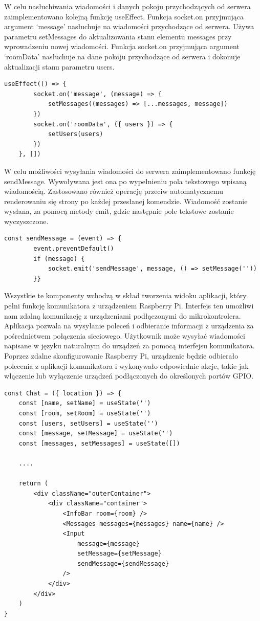 W celu nasłuchiwania wiadomości i danych pokoju przychodzących od serwera zaimplementowano kolejną funkcję useEffect. Funkcja socket.on przyjmująca argument ‘message’ nasłuchuje na wiadomości przychodzące od serwera. Używa parametru setMessages do aktualizowania stanu elementu messages przy wprowadzeniu nowej wiadomości. Funkcja socket.on przyjmująca argument ‘roomData’ nasłuchuje na dane pokoju przychodzące od serwera i dokonuje aktualizacji stanu parametru users. 
\begin{lstlisting}[caption=Implementacja funkcji nasłuchiwania wiadomości i danych przychodzących od serwera]
useEffect(() => {
        socket.on('message', (message) => {
            setMessages((messages) => [...messages, message])
        })
        socket.on('roomData', ({ users }) => {
            setUsers(users)
        })
    }, [])
\end{lstlisting}

W celu możliwości wysyłania wiadomości do serwera zaimplementowano funkcję sendMessage. Wywoływana jest ona po wypełnieniu pola tekstowego wpisaną wiadomością. Zastosowano również operację przeciw automatycznemu renderowaniu się strony po każdej przesłanej komendzie. Wiadomość zostanie wysłana, za pomocą metody emit, gdzie następnie pole tekstowe zostanie wyczyszczone.
\begin{lstlisting}[caption=Implementacja funkcji do wysyłania wiadomości]
const sendMessage = (event) => {
        event.preventDefault()
        if (message) {
            socket.emit('sendMessage', message, () => setMessage(''))
       	}}
\end{lstlisting}

Wszystkie te komponenty wchodzą w skład tworzenia widoku aplikacji, który pełni funkcję komunikatora z urządzeniem Raspberry Pi. Interfejs ten umożliwi nam zdalną komunikację z urządzeniami podłączonymi do mikrokontrolera. Aplikacja pozwala na wysyłanie poleceń i odbieranie informacji z urządzenia za pośrednictwem połączenia sieciowego. Użytkownik może wysyłać wiadomości napisane w języku naturalnym do urządzeń za pomocą interfejsu komunikatora. Poprzez zdalne skonfigurowanie Raspberry Pi, urządzenie będzie odbierało polecenia z aplikacji komunikatora i wykonywało odpowiednie akcje, takie jak włączenie lub wyłączenie urządzeń podłączonych do określonych portów GPIO.
\begin{lstlisting}[caption=Implementacja komponentu czatu]
const Chat = ({ location }) => {
    const [name, setName] = useState('')
    const [room, setRoom] = useState('')
    const [users, setUsers] = useState('')
    const [message, setMessage] = useState('')
    const [messages, setMessages] = useState([])

	....	

    return (
        <div className="outerContainer">
            <div className="container">
                <InfoBar room={room} />
                <Messages messages={messages} name={name} />
                <Input
                    message={message}
                    setMessage={setMessage}
                    sendMessage={sendMessage}
                />
            </div>
        </div>
    )
}
\end{lstlisting}
